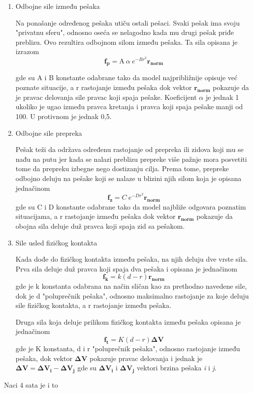\documentclass[12pt]{article}
\begin{document}
\begin{enumerate}

\item Odbojne sile između pešaka 

Na ponašanje određenog pešaka utiču ostali pešaci. Svaki pešak ima svoju "privatnu sferu", odnosno oseća se nelagodno kada mu drugi pešak priđe preblizu. Ovo rezultira odbojnom silom između pešaka. Ta sila opisana je izrazom
$$
\mathbf{f_{p}}=\mathrm{A}\ \alpha\ e^{-Br^2}\mathbf{r_{norm}}
$$

gde su A i B konstante odabrane tako da model najpribližnije opisuje već poznate situacije, a r rastojanje između pešaka dok vektor $\mathbf{r_{norm}}$ pokazuje da je pravac delovanja sile pravac koji spaja pešake. Koeficijent $\alpha$ je jednak 1 ukoliko je ugao između pravca kretanja i pravca koji spaja pešake manji od 100\degree. U protivnom je jednak 0,5.


\item Odbojne sile prepreka

Pešak teži da održava određenu rastojanje od prepreka ili zidova koji mu se nađu na putu jer kada se nalazi preblizu prepreke više pažnje mora posvetiti tome da prepreku izbegne nego dostizanju cilja. Prema tome, prepreke odbojno deluju na pešake koji se nalaze u blizini njih silom koja je opisana jednačinom
$$
\mathbf{f_{z}}=C\ e^{-Dr^2}\mathbf{r_{norm}}
$$
gde su C i D konstante odabrane tako da model najbliže odgovara poznatim situacijama, a r rastojanje između pešaka dok vektor $\mathbf{r_{norm}}$ pokazuje da obojna sila deluje duž pravca koji spaja zid sa pešakom. 

\item Sile usled fizičkog kontakta

Kada dođe do fizičkog kontakta između pešaka, na njih deluju dve vrste sila. Prva sila deluje duž pravca koji spaja dva pešaka i opisana je jednačinom
$$
\mathbf{f_k}=k(d-r)\mathbf{r_{norm}}
$$
gde je k konstanta odabrana na način sličan kao za prethodno navedene sile, dok je d "poluprečnik pešaka", odnosno maksimalno rastojanje za koje deluju sile fizičkog kontakta, a r rastojanje između pešaka.

Druga sila koja deluje prilikom fizičkog kontakta između pešaka opisana je jednačinom
$$
\mathbf{f_t}=K(d-r)\mathbf{\Delta V}
$$
gde je K konstanta, d i r "poluprečnik pešaka", odnosno rastojanje između pešaka, dok vektor $\mathbf{\Delta V}$ pokazuje pravac delovanja i jednak je $\mathbf{\Delta V}=\mathbf{\Delta V_i}-\mathbf{\Delta V_j}$ gde su $\mathbf{\Delta V_i}$ i $\mathbf{\Delta V_j}$ vektori brzina pešaka \emph{i} i \emph{j}.
\end{enumerate}
Naci 4 sata je i to
\end{document}
